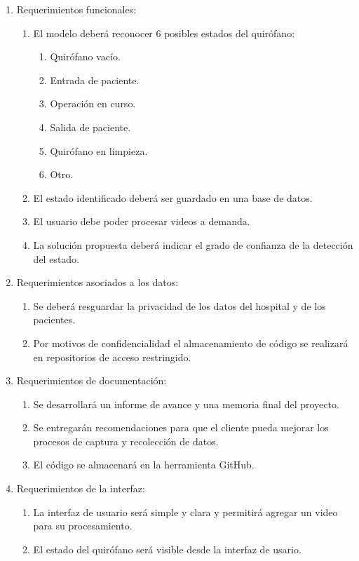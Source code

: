 \documentclass[
11pt, %
]{charter}
\begin{document}
\begin{enumerate}
	\item Requerimientos funcionales:
		\begin{enumerate}
			\item El modelo deberá reconocer 6 posibles estados del quirófano:
					\begin{enumerate}
						\item Quirófano vacío.
						\item Entrada de paciente.
						\item Operación en curso.
						\item Salida de paciente.
						\item Quirófano en limpieza.
						\item Otro.
					\end{enumerate}
			\item El estado identificado deberá ser guardado en una base de datos.
			\item El usuario debe poder procesar videos a demanda.
			\item La solución propuesta deberá indicar el grado de confianza de la detección del estado.
		\end{enumerate}
	\item Requerimientos asociados a los datos:
		\begin{enumerate}
			\item Se deberá resguardar la privacidad de los datos del hospital y de los pacientes.
			\item Por motivos de confidencialidad el almacenamiento de código se realizará en repositorios de acceso restringido.
		\end{enumerate}
	\item Requerimientos de documentación:
		\begin{enumerate}
		  \item Se desarrollará un informe de avance y una memoria final del proyecto.
		  \item Se entregarán recomendaciones para que el cliente pueda mejorar los procesos
		  de captura y recolección de datos.
		  \item El código se almacenará en la herramienta GitHub.
	    \end{enumerate}
	\item Requerimientos de la interfaz:
		\begin{enumerate}
		\item La interfaz de usuario será simple y clara y permitirá agregar un video para su procesamiento.
		\item El estado del quirófano será visible desde la interfaz de usario.
		\end{enumerate}	
\end{enumerate}
\end{document}
